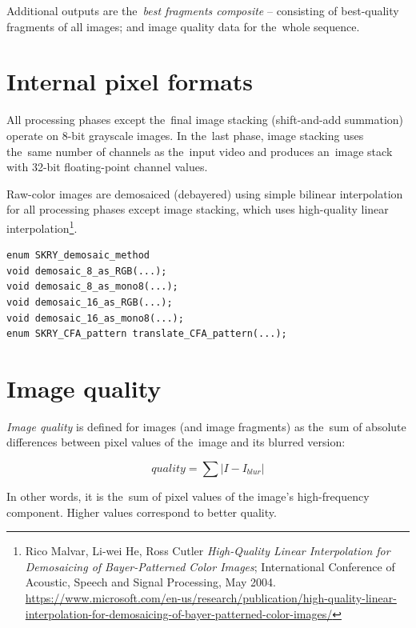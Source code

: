 \documentclass[12pt]{article}
\newcommand{\nbd}{\nobreakdash}
\begin{document}
Additional outputs are the~\emph{best fragments composite} -- consisting of best-quality fragments of all images;
and image quality data for the~whole sequence.

\section{Internal pixel formats}

All processing phases except the~final image stacking (shift\nbd-and\nbd-add summation) operate on
8\nbd-bit grayscale images. In the~last phase, image stacking uses the~same number of channels as the~input
video and produces an~image stack with 32\nbd-bit floating\nbd-point channel values.

Raw\nbd-color images are demosaiced (debayered) using simple bilinear interpolation for all processing phases except
image stacking, which uses high-quality linear interpolation\footnote{Rico Malvar, Li-wei He, Ross Cutler
\emph{High\nbd-Quality Linear Interpolation for Demosaicing of Bayer-Patterned Color Images}; International Conference
of Acoustic, Speech and Signal Processing, May 2004.
\url{https://www.microsoft.com/en-us/research/publication/high-quality-linear-interpolation-for-demosaicing-of-bayer-patterned-color-images/}}.

\begin{lstlisting}[caption={Demosaicing functions ({\ttfamily{demosaic.h/.c}})}]
enum SKRY_demosaic_method
void demosaic_8_as_RGB(...);
void demosaic_8_as_mono8(...);
void demosaic_16_as_RGB(...);
void demosaic_16_as_mono8(...);
enum SKRY_CFA_pattern translate_CFA_pattern(...);
\end{lstlisting}

\section{Image quality}\label{sec:quality}

\emph{Image quality} is defined for images (and image fragments) as the~sum of absolute differences between pixel values
of the~image and its blurred version:

\[
quality = \sum | I - I_{blur} |
\]

In other words, it is the~sum of pixel values of the image's high\nbd-frequency component. Higher values correspond to
better quality.
\end{document}
